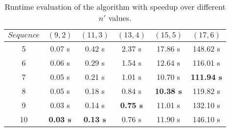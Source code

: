 \begin{table}[h] %
	\renewcommand{\arraystretch}{1.3}
	\caption{Runtime evaluation of the algorithm with speedup over different $n'$ values.}
	\label{tbl:nprime-speedup}
	\centering
	\begin{tabular}{|c|c|c|c|c|c|}
		\hline 
		\bfseries\boldmath $Sequence$ & 
		\bfseries\boldmath $(9,2)$ & 
		\bfseries\boldmath $(11,3)$ & 
		\bfseries\boldmath $(13,4)$ & 
		\bfseries\boldmath $(15,5)$ & 
		\bfseries\boldmath $(17,6)$ \\
		\hline
			5	& 	0.07 s			& 	0.42 s 			&	2.37 s			&	17.86 s				&	148.62 s\\
			6	& 	0.06 s			& 	0.29 s			& 	1.54 s			&	12.64 s				&	116.01 s\\
			7	& 	0.05 s			& 	0.21 s			& 	1.01 s			&	10.70 s				&	\textbf{111.94 s}\\
			8	& 	0.05 s			&	0.18 s			& 	0.84 s			&	\textbf{10.38 s}	&	119.82 s\\
			9	& 	0.03 s 			& 	0.14 s			& 	\textbf{0.75 s}	&	11.01 s				&	132.10 s\\
			10	& 	\textbf{0.03 s} &	\textbf{0.13 s}	& 	0.76 s			&	11.90 s				&	146.10 s\\
		\hline\end{tabular}
\end{table}